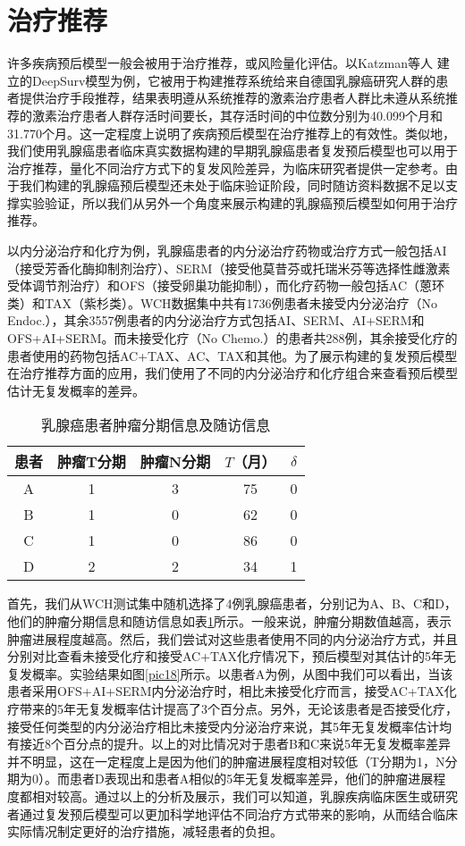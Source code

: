 \section{治疗推荐}
许多疾病预后模型一般会被用于治疗推荐，或风险量化评估。以Katzman等人 建立的DeepSurv模型为例，它被用于构建推荐系统给来自德国乳腺癌研究人群的患者提供治疗手段推荐，结果表明遵从系统推荐的激素治疗患者人群比未遵从系统推荐的激素治疗患者人群存活时间要长，其存活时间的中位数分别为40.099个月和31.770个月。这一定程度上说明了疾病预后模型在治疗推荐上的有效性。类似地，我们使用乳腺癌患者临床真实数据构建的早期乳腺癌患者复发预后模型也可以用于治疗推荐，量化不同治疗方式下的复发风险差异，为临床研究者提供一定参考。由于我们构建的乳腺癌预后模型还未处于临床验证阶段，同时随访资料数据不足以支撑实验验证，所以我们从另外一个角度来展示构建的乳腺癌预后模型如何用于治疗推荐。

以内分泌治疗和化疗为例，乳腺癌患者的内分泌治疗药物或治疗方式一般包括AI（接受芳香化酶抑制剂治疗）、SERM（接受他莫昔芬或托瑞米芬等选择性雌激素受体调节剂治疗）和OFS（接受卵巢功能抑制），而化疗药物一般包括AC（蒽环类）和TAX（紫杉类）。WCH数据集中共有1736例患者未接受内分泌治疗（No Endoc.），其余3557例患者的内分泌治疗方式包括AI、SERM、AI+SERM和OFS+AI+SERM。而未接受化疗（No Chemo.）的患者共288例，其余接受化疗的患者使用的药物包括AC+TAX、AC、TAX和其他。为了展示构建的复发预后模型在治疗推荐方面的应用，我们使用了不同的内分泌治疗和化疗组合来查看预后模型估计无复发概率的差异。

\begin{table}[H]
\caption{乳腺癌患者肿瘤分期信息及随访信息}
\begin{tabular}{ccccc}
\toprule
患者 & 肿瘤T分期 & 肿瘤N分期 & $T$（月） & $\delta$ \\ 
\midrule
A & 1 & 3 & 75 & 0 \\
B & 1 & 0 & 62 & 0 \\
C & 1 & 0 & 86 & 0 \\
D & 2 & 2 & 34 & 1 \\
\bottomrule
\end{tabular}
\label{table06}
\end{table}

首先，我们从WCH测试集中随机选择了4例乳腺癌患者，分别记为A、B、C和D，他们的肿瘤分期信息和随访信息如表\ref{table06}所示。一般来说，肿瘤分期数值越高，表示肿瘤进展程度越高。然后，我们尝试对这些患者使用不同的内分泌治疗方式，并且分别对比查看未接受化疗和接受AC+TAX化疗情况下，预后模型对其估计的5年无复发概率。实验结果如图\ref{pic18}所示。以患者A为例，从图中我们可以看出，当该患者采用OFS+AI+SERM内分泌治疗时，相比未接受化疗而言，接受AC+TAX化疗带来的5年无复发概率估计提高了3个百分点。另外，无论该患者是否接受化疗，接受任何类型的内分泌治疗相比未接受内分泌治疗来说，其5年无复发概率估计均有接近8个百分点的提升。以上的对比情况对于患者B和C来说5年无复发概率差异并不明显，这在一定程度上是因为他们的肿瘤进展程度相对较低（T分期为1，N分期为0）。而患者D表现出和患者A相似的5年无复发概率差异，他们的肿瘤进展程度都相对较高。通过以上的分析及展示，我们可以知道，乳腺疾病临床医生或研究者通过复发预后模型可以更加科学地评估不同治疗方式带来的影响，从而结合临床实际情况制定更好的治疗措施，减轻患者的负担。

